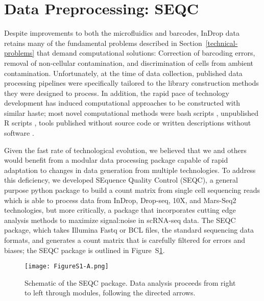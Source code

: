 \section{Data Preprocessing: SEQC}

Despite improvements to both the microfluidics and barcodes, InDrop data retains many of the fundamental problems described in Section~\ref{technical-problems} that demand computational solutions: Correction of barcoding errors, removal of non-cellular contamination, and discrimination of cells from ambient contamination.  
Unfortunately, at the time of data collection, published data processing pipelines were specifically tailored to the library construction methods they were designed to process. 
In addition, the rapid pace of technology development has induced computational approaches to be constructed with similar haste; most novel computational methods were bash scripts \citep{Shalek2013,Shalek2014}, unpublished R scripts \citep{Jaitin2014}, tools published without source code \citep{Macosko2015} or written descriptions without software \citep{Klein2015}. 

Given the fast rate of technological evolution, we believed that we and others would benefit from a modular data processing package capable of rapid adaptation to changes in data generation from multiple technologies.
To address this deficiency, we developed SEquence Quality Control (SEQC), a general purpose python package to build a count matrix from single cell sequencing reads which is able to process data from InDrop, Drop-seq, 10X, and Mars-Seq2 technologies, but more critically, a package that incorporates cutting edge analysis methods to maximize signal:noise in scRNA-seq data. 
The SEQC package, which takes Illumina Fastq or BCL files, the standard sequencing data formats, and generates a count matrix that is carefully filtered for errors and biases; the SEQC package is outlined in Figure~S\ref{fig:s1a}. 

\begin{figure}
\centering
\texttt{[image: FigureS1-A.png]}
\caption{Schematic of the SEQC package. Data analysis proceeds from right to left through modules, following the directed arrows.}
\label{fig:s1a}
\end{figure} 

